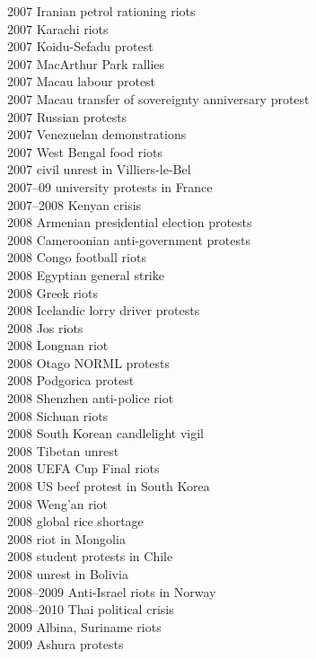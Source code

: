 2007 Iranian petrol rationing riots\\
2007 Karachi riots\\
2007 Koidu-Sefadu protest\\
2007 MacArthur Park rallies\\
2007 Macau labour protest\\
2007 Macau transfer of sovereignty anniversary protest\\
2007 Russian protests\\
2007 Venezuelan demonstrations\\
2007 West Bengal food riots\\
2007 civil unrest in Villiers-le-Bel\\
2007–09 university protests in France\\
2007–2008 Kenyan crisis\\
2008 Armenian presidential election protests\\
2008 Cameroonian anti-government protests\\
2008 Congo football riots\\
2008 Egyptian general strike\\
2008 Greek riots\\
2008 Icelandic lorry driver protests\\
2008 Jos riots\\
2008 Longnan riot\\
2008 Otago NORML protests\\
2008 Podgorica protest\\
2008 Shenzhen anti-police riot\\
2008 Sichuan riots\\
2008 South Korean candlelight vigil\\
2008 Tibetan unrest\\
2008 UEFA Cup Final riots\\
2008 US beef protest in South Korea\\
2008 Weng'an riot\\
2008 global rice shortage\\
2008 riot in Mongolia\\
2008 student protests in Chile\\
2008 unrest in Bolivia\\
2008–2009 Anti-Israel riots in Norway\\
2008–2010 Thai political crisis\\
2009 Albina, Suriname riots\\
2009 Ashura protests\\
